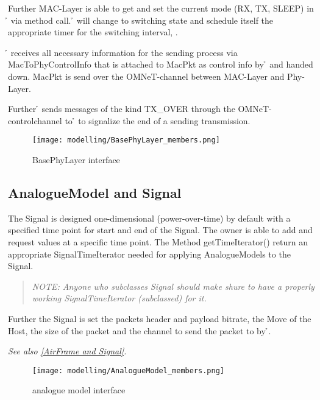 Further MAC-Layer is able to get and set the current mode (RX, TX, SLEEP) in \h{\bp} via method call.
\h{\bp} will change to switching state and schedule itself the appropriate timer for the switching interval, .


\h{\bp} receives all necessary information for the sending process via MacToPhyControlInfo that is attached to MacPkt as control info by \h{\bm} and handed down.
MacPkt is send over the OMNeT-channel between MAC-Layer and Phy-Layer.

Further \h{\bp} sends messages of the kind TX\_OVER through the OMNeT-controlchannel
to \h{\bm} to signalize the end of a sending transmission.



\begin{figure}[H]
 \centering
 \texttt{[image: modelling/BasePhyLayer\_members.png]}
 \caption{BasePhyLayer interface}
 \label{fig: BasePhyLayer interface}
\end{figure}



\subsection{AnalogueModel and Signal}
\label{AM and Signal}

The Signal is designed one-dimensional (power-over-time) by default with a specified time point for start and end of the Signal. The owner is able
to add and request values at a specific time point.
The Method getTimeIterator() return an appropriate SignalTimeIterator needed for applying AnalogueModels to the Signal.

\begin{quote}
\emph{NOTE: Anyone who subclasses Signal should make shure to have a properly
working SignalTimeIterator (subclassed) for it.}
\end{quote}

Further the Signal is set the packets header and payload bitrate,  the Move of the Host, the size of the packet and the channel to send the packet to by \h{\bp}.

\emph{See also \ref{AirFrame and Signal}.}

\begin{figure}[H]
 \centering
 \texttt{[image: modelling/AnalogueModel\_members.png]}
 \caption{analogue model interface}
 \label{fig: analogue model interface}
\end{figure}


